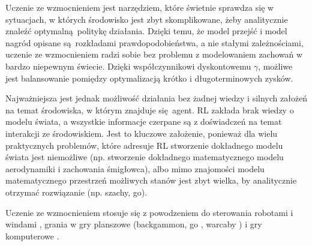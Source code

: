 Uczenie ze wzmocnieniem jest narzędziem, które świetnie sprawdza się w sytuacjach, w których środowisko jest zbyt skomplikowane, żeby analitycznie znaleźć optymalną politykę działania. Dzięki temu, że model przejść i model nagród opisane są rozkładami prawdopodobieństwa, a nie stałymi zależnościami, uczenie ze wzmocnieniem radzi sobie bez problemu z modelowaniem zachowań w bardzo niepewnym świecie. Dzięki współczynnikowi dyskontowemu $\gamma$, możliwe jest balansowanie pomiędzy optymalizacją krótko i długoterminowych zysków.

Najważniejsza jest jednak możliwość działania bez żadnej wiedzy i silnych założeń na temat środowiska, w którym znajduje się agent. RL zakłada brak wiedzy o modelu świata, a wszystkie informacje czerpane są z doświadczeń na temat interakcji ze środowiskiem. Jest to kluczowe założenie, ponieważ dla wielu praktycznych problemów, które adresuje RL stworzenie dokładnego modelu świata jest niemożliwe (np. stworzenie dokładnego matematycznego modelu aerodynamiki i zachowania śmigłowca), albo mimo znajomości modelu matematycznego przestrzeń możliwych stanów jest zbyt wielka, by analitycznie otrzymać rozwiązanie (np. szachy, go).

Uczenie ze wzmocnieniem stosuje się z powodzeniem do sterowania robotami \cite{Mataric94rewardfunctions} i windami \cite{Crites96improvingelevator}, grania w gry planszowe (backgammon\cite{Tesauro1992451}, \break go \cite{Silver_2016}, warcaby \cite{Samuel:1959:SML:1661923.1661924}) i gry komputerowe \cite{mnih2015human}.



